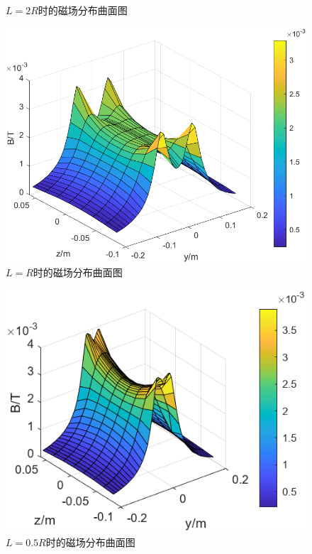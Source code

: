 \documentclass{ctexart}
\begin{document}
\begin{multicols}{2}
\begin{figure}[H]
    \caption{$L=2R$时的磁场分布曲面图} 
    \label{实测surf}
\end{figure}
\begin{figure}[H]
    \centering
    \includegraphics[scale=0.6]{./pic/realsurfR.png}
    \caption{$L=R$时的磁场分布曲面图} 
\end{figure}
\begin{figure}[H]
    \centering
    \includegraphics[scale=1]{./pic/realsurf0.5R.png}
    \caption{$L=0.5R$时的磁场分布曲面图} 
    \label{实测surf2}
\end{figure}

\end{multicols}
\end{document}
